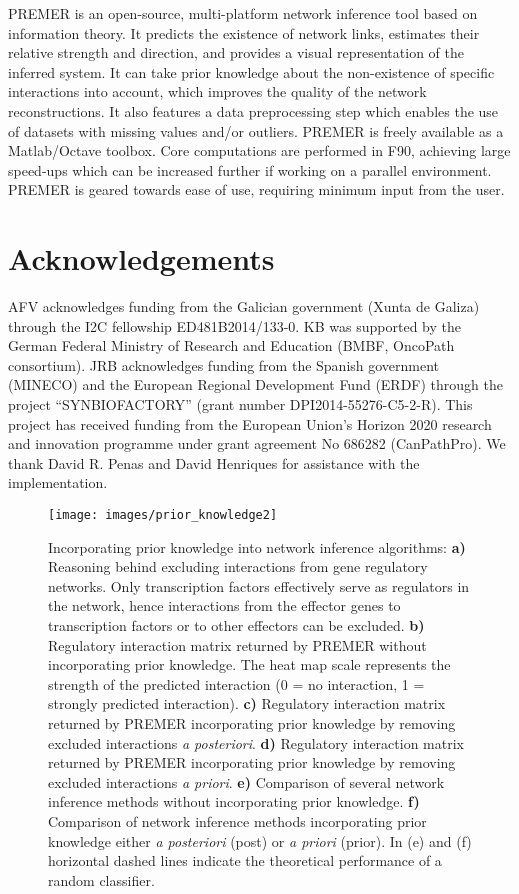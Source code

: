 \documentclass{llncs}
\begin{document}
PREMER is an open-source, multi-platform network inference tool based on information theory.  
It predicts the existence of network links, estimates their relative strength and direction, and provides a visual representation of the inferred system.
It can take prior knowledge about the non-existence of specific interactions into account, which improves the quality of the network reconstructions.
It also features a data preprocessing step which enables the use of datasets with missing values and/or outliers.
PREMER is freely available as a Matlab/Octave toolbox.
Core computations are performed in F90, achieving large speed-ups which can be increased further if working on a parallel environment.
PREMER is geared towards ease of use, requiring minimum input from the user. 
 

\section*{Acknowledgements}
AFV acknowledges funding from the Galician government (Xunta de Galiza) through the I2C fellowship ED481B2014/133-0.
KB was supported by the German Federal Ministry of Research and Education (BMBF, OncoPath consortium).
JRB acknowledges funding from the Spanish government (MINECO) and the European Regional Development Fund (ERDF) through the project  ``SYNBIOFACTORY'' (grant number DPI2014-55276-C5-2-R). 
This project has received funding from the European Union’s Horizon 2020 research and innovation programme under grant agreement No 686282 (CanPathPro).
We thank David R. Penas and David Henriques for assistance with the implementation.


\begin{figure}[H]
	\begin{center}
		\texttt{[image: images/prior\_knowledge2]}
		\caption{Incorporating prior knowledge into network inference algorithms: \textbf{a)} Reasoning behind excluding interactions from gene regulatory networks. Only transcription factors effectively serve as regulators in the network, hence interactions from the effector genes to transcription factors or to other effectors can be excluded. \textbf{b)} Regulatory interaction matrix returned by PREMER without incorporating prior knowledge.
		The heat map scale represents the strength of the predicted interaction (0 = no interaction, 1 = strongly predicted interaction). 		 \textbf{c)} Regulatory interaction matrix returned by PREMER incorporating prior knowledge by removing excluded interactions \textit{a posteriori}. \textbf{d)} Regulatory interaction matrix returned by PREMER incorporating prior knowledge by removing excluded interactions \textit{a priori}. \textbf{e)} Comparison of several network inference methods without incorporating prior knowledge. \textbf{f)} Comparison of network inference methods incorporating prior knowledge either \textit{a posteriori} (post) or \textit{a priori} (prior). In (e) and (f) horizontal dashed lines indicate the theoretical performance of a random classifier.}
	\end{center}
	\label{prior}
\end{figure} 
 

 

\end{document}
